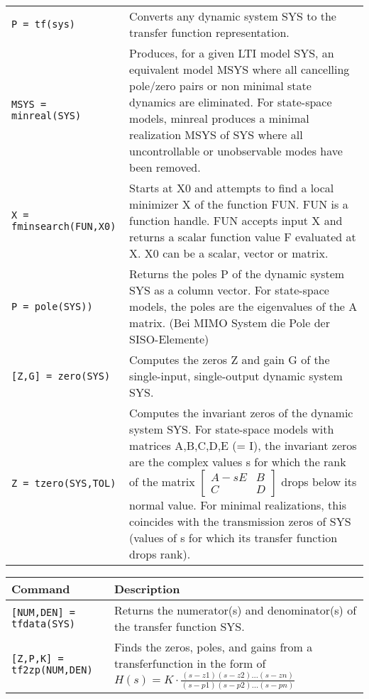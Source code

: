 \begin{center}
\begin{tabular}{p{5cm}|p{8.5cm}}
        \texttt{P = tf(sys)}  & Converts any dynamic system SYS to the transfer function representation. \\
        
        \texttt{MSYS = minreal(SYS)}  &  Produces, for a given LTI model SYS, an equivalent model MSYS where all cancelling pole/zero pairs or non minimal state dynamics are eliminated.  For state-space models, minreal produces a minimal realization MSYS of SYS where all uncontrollable or unobservable modes have been removed.\\
        
        \texttt{X = fminsearch(FUN,X0)}  &  Starts at X0 and attempts to find a local minimizer X of the function FUN.  FUN is a function handle.  FUN accepts input X and returns a scalar function value F evaluated at X. X0 can be a scalar, vector or matrix.\\
        
        \texttt{P = pole(SYS))}  & Returns the poles P of the dynamic system SYS as a column vector. For state-space models, the poles are the eigenvalues of the A matrix. (Bei MIMO System die Pole der SISO-Elemente) \\
        
        \texttt{[Z,G] = zero(SYS)} & Computes the zeros Z and gain G of the single-input, single-output dynamic system SYS.\\
        
        \texttt{Z = tzero(SYS,TOL)}  &  Computes the invariant zeros of the dynamic system SYS. For state-space models with matrices A,B,C,D,E (= I), the invariant zeros are the complex values s for which the rank of the matrix $\begin{bmatrix} A -sE & B\\ C & D\end{bmatrix}$ drops below its normal value. For minimal realizations, this coincides with the transmission zeros of SYS (values of s for which its transfer function drops rank).\\ 
        
    \end{tabular}
    \begin{tabular}{p{5cm}|p{8.5cm}}
        \textbf{Command}    &   \textbf{Description}\\
        \hline
        \texttt{[NUM,DEN] = tfdata(SYS)} & Returns the numerator(s) and denominator(s) of the transfer function SYS. \\
        
        \texttt{[Z,P,K] = tf2zp(NUM,DEN)} & Finds the zeros, poles, and gains from a transferfunction in the form of $\displaystyle H(s) = K\cdot\frac{(s-z1)(s-z2)\dots(s-zn)}{(s-p1)(s-p2)\dots(s-pn)}$\\
        

\end{tabular}
\end{center}
